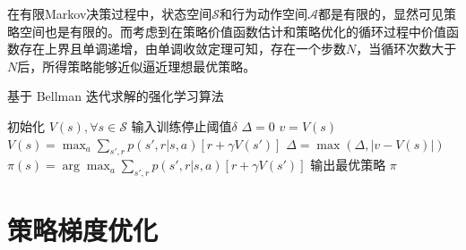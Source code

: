在有限Markov决策过程中，状态空间$\mathcal{S}$和行为动作空间$\mathcal{A}$都是有限的，显然可见策略空间也是有限的。而考虑到在策略价值函数估计和策略优化的循环过程中价值函数存在上界且单调递增，由单调收敛定理可知，存在一个步数$N$，当循环次数大于$N$后，所得策略能够近似逼近理想最优策略。

\begin{algorithm}[ht]
    \caption{基于 Bellman 迭代求解的强化学习算法}
    \label{algo:bellman-update}
    \begin{algorithmic}
        \STATE 初始化 $V(s), \forall s\in \mathcal S$
        \STATE 输入训练停止阈值$\delta$
        \STATE
        \REPEAT
        \STATE $\Delta= 0$
        \STATE $v= V(s)$
        \STATE $V(s)= \max_a\sum_{s',r}p(s',r|s,a)[r+\gamma V(s')]$
        \STATE $\Delta = \max(\Delta,|v-V(s)|)$
        \ENDFOR
        \UNTIL{ $\Delta<\delta$}
        \STATE
        \STATE $\pi(s)=\arg\max_a\sum_{s',r}p(s',r|s,a)[r+\gamma V(s')]$
        \STATE 输出最优策略 $\pi$
    \end{algorithmic}
\end{algorithm}

\section{策略梯度优化}


